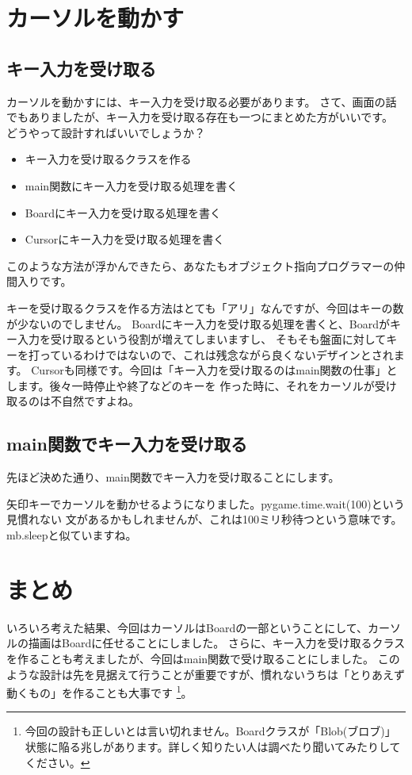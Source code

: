 \documentclass[12pt, a4paper, dvipdfmx]{book}
\begin{document}
\section{カーソルを動かす}
\subsection{キー入力を受け取る}
カーソルを動かすには、キー入力を受け取る必要があります。
さて、画面の話でもありましたが、キー入力を受け取る存在も一つにまとめた方がいいです。
どうやって設計すればいいでしょうか？
\begin{itemize}
  \item キー入力を受け取るクラスを作る
  \item main関数にキー入力を受け取る処理を書く
  \item Boardにキー入力を受け取る処理を書く
  \item Cursorにキー入力を受け取る処理を書く
\end{itemize}
このような方法が浮かんできたら、あなたもオブジェクト指向プログラマーの仲間入りです。

キーを受け取るクラスを作る方法はとても「アリ」なんですが、今回はキーの数が少ないのでしません。
Boardにキー入力を受け取る処理を書くと、Boardがキー入力を受け取るという役割が増えてしまいますし、
そもそも盤面に対してキーを打っているわけではないので、これは残念ながら良くないデザインとされます。
Cursorも同様です。今回は「キー入力を受け取るのはmain関数の仕事」とします。後々一時停止や終了などのキーを
作った時に、それをカーソルが受け取るのは不自然ですよね。

\subsection{main関数でキー入力を受け取る}
先ほど決めた通り、main関数でキー入力を受け取ることにします。

矢印キーでカーソルを動かせるようになりました。pygame.time.wait(100)という見慣れない
文があるかもしれませんが、これは100ミリ秒待つという意味です。mb.sleepと似ていますね。

\section{まとめ}
いろいろ考えた結果、今回はカーソルはBoardの一部ということにして、カーソルの描画はBoardに任せることにしました。
さらに、キー入力を受け取るクラスを作ることも考えましたが、今回はmain関数で受け取ることにしました。
このような設計は先を見据えて行うことが重要ですが、慣れないうちは「とりあえず動くもの」を作ることも大事です
\footnote{今回の設計も正しいとは言い切れません。Boardクラスが「Blob(ブロブ)」状態に陥る兆しがあります。詳しく知りたい人は調べたり聞いてみたりしてください。}。
\end{document}

